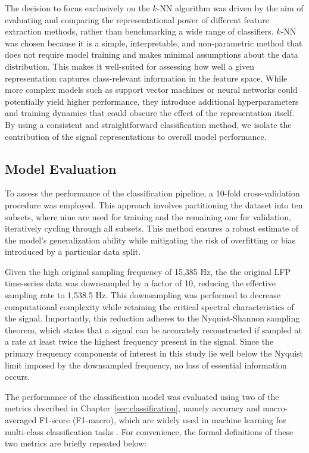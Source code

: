 \documentclass{article}
\begin{document}
The decision to focus exclusively on the $k$-NN algorithm was driven by the aim of evaluating and comparing the representational power of different feature extraction methods, rather than benchmarking a wide range of classifiers. $k$-NN was chosen because it is a simple, interpretable, and non-parametric method that does not require model training and makes minimal assumptions about the data distribution. This makes it well-suited for assessing how well a given representation captures class-relevant information in the feature space. While more complex models such as support vector machines or neural networks could potentially yield higher performance, they introduce additional hyperparameters and training dynamics that could obscure the effect of the representation itself. By using a consistent and straightforward classification method, we isolate the contribution of the signal representations to overall model performance.

\subsection{Model Evaluation} \label{sec:evaluation}
To assess the performance of the classification pipeline, a 10-fold cross-validation procedure was employed. This approach involves partitioning the dataset into ten subsets, where nine are used for training and the remaining one for validation, iteratively cycling through all subsets. This method ensures a robust estimate of the model’s generalization ability while mitigating the risk of overfitting or bias introduced by a particular data split.

Given the high original sampling frequency of 15,385 Hz, the the original LFP time-series data was downsampled by a factor of 10, reducing the effective sampling rate to 1,538.5 Hz. This downsampling was performed to decrease computational complexity while retaining the critical spectral characteristics of the signal. Importantly, this reduction adheres to the Nyquist-Shannon sampling theorem, which states that a signal can be accurately reconstructed if sampled at a rate at least twice the highest frequency present in the signal. Since the primary frequency components of interest in this study lie well below the Nyquist limit imposed by the downsampled frequency, no loss of essential information occurs.

The performance of the classification model was evaluated using two of the metrics described in Chapter~\ref{sec:classification}, namely accuracy and macro-averaged F1-score (F1-macro), which are widely used in machine learning for multi-class classification tasks \cite{sokolova2009}. For convenience, the formal definitions of these two metrics are briefly repeated below:
\end{document}
